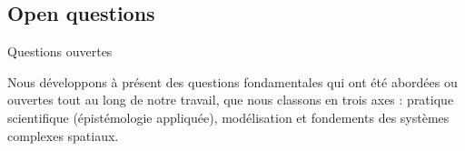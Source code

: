 





\subsection*{Open questions}{Questions ouvertes}


Nous développons à présent des questions fondamentales qui ont été abordées ou ouvertes tout au long de notre travail, que nous classons en trois axes : pratique scientifique (épistémologie appliquée), modélisation et fondements des systèmes complexes spatiaux.


